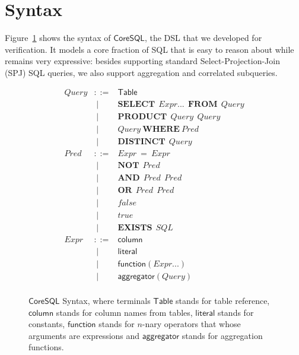 \section{Syntax}

Figure~\ref{tab:sql-syntax} shows the syntax of $\mathsf{CoreSQL}$, the DSL that we developed for verification. It models a core fraction of SQL that is easy to reason about while remains very expressive: besides supporting standard
Select-Projection-Join (SPJ) SQL queries, we also support aggregation and correlated subqueries.  

\begin{figure}[t]
\centering
\[
\begin{array}{rcl}
  \mathit{Query} & ::=  &  \mathsf{Table} \\
        & \; \mid & \mathbf{SELECT}~~\mathit{Expr}...~~\mathbf{FROM}~~\mathit{Query}      \\ 
        & \; \mid  & \mathbf{PRODUCT}~~\mathit{Query}~~\mathit{Query}        \\
        & \; \mid & \mathit{Query}~\mathbf{WHERE}~\mathit{Pred}        \\
        & \; \mid & \mathbf{DISTINCT}~~\mathit{Query}                \\
  \mathit{Pred} & ::= & \mathit{Expr} ~ \mathbf{=}~\mathit{Expr} \\
       & \; \mid &  \mathbf{NOT} ~~ \mathit{Pred}      \\
       & \; \mid & \mathbf{AND} ~~ \mathit{Pred} ~~ \mathit{Pred}      \\ 
       & \; \mid & \mathbf{OR} ~~ \mathit{Pred} ~~ \mathit{Pred} \\
       & \; \mid & false \\
       & \; \mid & true  \\
       & \; \mid & \mathbf{EXISTS} ~~ SQL \\
  \mathit{Expr} & ::= & \mathsf{column}                     \\
        & \; \mid & \mathsf{literal}                  \\
        & \; \mid & \mathsf{function}(\mathit{Expr}...)     \\
        & \; \mid & \mathsf{aggregator}(\mathit{Query})  \\  
\end{array}
\]
\caption{$\mathsf{CoreSQL}$ Syntax, where terminals $\mathsf{Table}$ stands for table reference,  $\mathsf{column}$ stands for column names from tables, $\mathsf{literal}$ stands for constants, $\mathsf{function}$ stands for $n$-nary operators that whose arguments are expressions and $\mathsf{aggregator}$ stands for aggregation functions.}
\label{tab:sql-syntax}
\end{figure}

